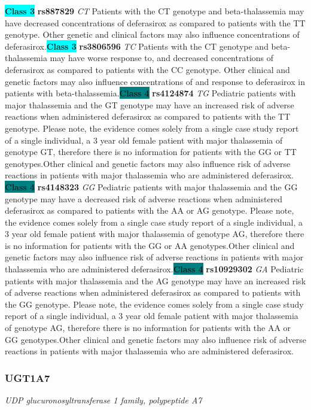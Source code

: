 \documentclass{report}
\begin{document}
\textbf{\colorbox{cyan} {Class 3}} \textbf{ rs887829 } \textit{ CT }
Patients with the CT genotype and beta-thalassemia may have decreased concentrations of deferasirox as compared to patients with the TT genotype. Other genetic and clinical factors may also influence concentrations of deferasirox.\newline\textbf{\colorbox{cyan} {Class 3}} \textbf{ rs3806596 } \textit{ TC }
Patients with the CT genotype and beta-thalassemia may have worse response to, and decreased concentrations of deferasirox as compared to patients with the CC genotype. Other clinical and genetic factors may also influence concentrations of and response to deferasirox in patients with beta-thalassemia.\newline\textbf{\colorbox{teal} {Class 4}} \textbf{ rs4124874 } \textit{ TG }
Pediatric patients with major thalassemia and the GT genotype may have an increased risk of adverse reactions when administered deferasirox as compared to patients with the TT genotype. Please note, the evidence comes solely from a single case study report of a single individual, a 3 year old female patient with major thalassemia of genotype GT, therefore there is no information for patients with the GG or TT genotypes.Other clinical and genetic factors may also influence risk of adverse reactions in patients with major thalassemia who are administered deferasirox. \newline\textbf{\colorbox{teal} {Class 4}} \textbf{ rs4148323 } \textit{ GG }
Pediatric patients with major thalassemia and the GG genotype may have a decreased risk of adverse reactions when administered deferasirox as compared to patients with the AA or AG genotype. Please note, the evidence comes solely from a single case study report of a single individual, a 3 year old female patient with major thalassemia of genotype AG, therefore there is no information for patients with the GG or AA genotypes.Other clinical and genetic factors may also influence risk of adverse reactions in patients with major thalassemia who are administered deferasirox.\newline\textbf{\colorbox{teal} {Class 4}} \textbf{ rs10929302 } \textit{ GA }
Pediatric patients with major thalassemia and the AG genotype may have an increased risk of adverse reactions when administered deferasirox as compared to patients with the GG genotype. Please note, the evidence comes solely from a single case study report of a single individual, a 3 year old female patient with major thalassemia of genotype AG, therefore there is no information for patients with the AA or GG genotypes.Other clinical and genetic factors may also influence risk of adverse reactions in patients with major thalassemia who are administered deferasirox.\newline\subsubsection{ UGT1A7 }
\textit{ UDP glucuronosyltransferase 1 family, polypeptide A7 }
\end{document}
